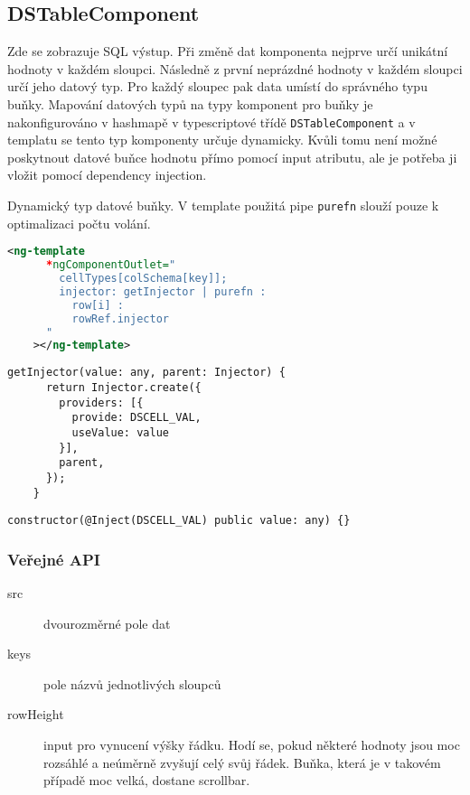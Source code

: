 \subsection{DSTableComponent}

Zde se zobrazuje SQL výstup. Při změně dat komponenta nejprve určí unikátní hodnoty v každém sloupci. Následně z první neprázdné hodnoty v každém sloupci určí jeho datový typ. Pro každý sloupec pak data umístí do správného typu buňky. Mapování datových typů na typy komponent pro buňky je nakonfigurováno v hashmapě v typescriptové třídě \lstinline|DSTableComponent| a v templatu se tento typ komponenty určuje dynamicky. Kvůli tomu není možné poskytnout datové buňce hodnotu přímo pomocí input atributu, ale je potřeba ji vložit pomocí dependency injection.

\begin{exmp}
  Dynamický typ datové buňky. V template použitá pipe \/\lstinline|purefn| slouží pouze k optimalizaci počtu volání.

  \begin{lstlisting}[title={Template},language=XML]
    <ng-template
      *ngComponentOutlet="
        cellTypes[colSchema[key]];
        injector: getInjector | purefn :
          row[i] :
          rowRef.injector
      "
    ></ng-template>
  \end{lstlisting}

  \begin{lstlisting}[title={funkce getInjector}]
    getInjector(value: any, parent: Injector) {
      return Injector.create({
        providers: [{
          provide: DSCELL_VAL,
          useValue: value
        }],
        parent,
      });
    }
  \end{lstlisting}

  \begin{lstlisting}[title={konstruktor konkrétní datové buňky}]
    constructor(@Inject(DSCELL_VAL) public value: any) {}
  \end{lstlisting}
\end{exmp}

\subsubsection*{Veřejné API}

\begin{description}
  \item[src] dvourozměrné pole dat
  \item[keys] pole názvů jednotlivých sloupců
  \item[rowHeight] input pro vynucení výšky řádku. Hodí se, pokud některé hodnoty jsou moc rozsáhlé a neúměrně zvyšují celý svůj řádek. Buňka, která je v takovém případě moc velká, dostane scrollbar.
\end{description}

